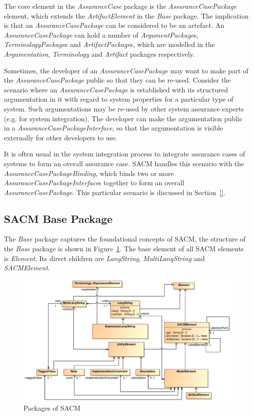 The core element in the \textit{AssuranceCase} package is the \textit{AssuranceCasePackage} element, which extends the \textit{ArtifactElement} in the \textit{Base} package. The implication is that an \textit{AssuranceCasePackage} can be considered to be an artefact. An \textit{AssuranceCasePackage} can hold a number of \textit{ArgumentPackage}s, \textit{TerminologyPackage}s and \textit{ArtifactPackage}s, which are modelled in the \textit{Argumentation}, \textit{Terminology} and \textit{Artifact} packages respectively.

Sometimes, the developer of an \textit{AssuranceCasePackage} may want to make part of the \textit{AssuranceCasePackage} public so that they can be re-used. Consider the scenario where an \textit{AssuranceCasePackage} is established with its structured argumentation in it with regard to system properties for a particular type of system. Such argumentations may be re-used by other system assurance experts (e.g. for system integration). The developer can make the argumentation public in a \textit{AssuranceCasePackageInterface}, so that the argumentation is visible externally for other developers to use.

It is often usual in the system integration process to integrate assurance cases of systems to form an overall assurance case. SACM handles this scenario with the \textit{AssuranceCasePackageBinding}, which binds two or more \textit{AssuranceCasePackageInterface}s together to form an overall \textit{AssuranceCasePackage}. This particular scenario is discussed in Section~\ref{}.

\subsection{SACM Base Package}
\label{sec:basePack}
The \textit{Base} package captures the foundational concepts of SACM, the structure of the \textit{Base} package is shown in Figure~\ref{fig:base}. The base element of all SACM elements is \textit{Element}. Its direct children are \textit{LangString}, \textit{MultiLangString} and \textit{SACMElement}.
\begin{figure}
	\centering
	\includegraphics[width=1\linewidth]{fig/Base.eps}
	\caption{Packages of SACM}
	\label{fig:base}
\end{figure}

